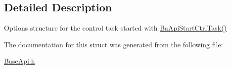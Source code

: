\subsection{Detailed Description}
Options structure for the control task started with \hyperlink{BaseApi_8h_a60c99fae43923e540eaafa66bfe17508}{Ba\+Api\+Start\+Ctrl\+Task()} 

The documentation for this struct was generated from the following file\+:\begin{DoxyCompactItemize}
\item 
\hyperlink{BaseApi_8h}{Base\+Api.\+h}\end{DoxyCompactItemize}
